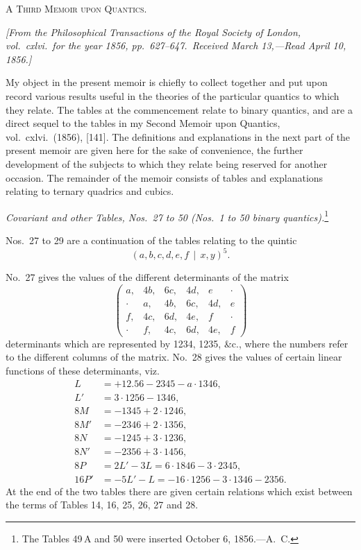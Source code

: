 \documentclass[11pt]{article}
\begin{document}
\begin{center}\textsc{A Third Memoir upon Quantics.}\end{center}

\medskip

\noindent\textit{[From the Philosophical Transactions of the Royal Society of London, vol.\ cxlvi.\ for the year 1856, pp.\ 627--647.\ Received March 13,---Read April 10, 1856.]}

\medskip

\noindent My object in the present memoir is chiefly to collect together and put upon record various results useful in the theories of the particular quantics to which they relate. The tables at the commencement relate to binary quantics, and are a direct sequel to the tables in my Second Memoir upon Quantics, vol.\ cxlvi.\ (1856), [141]. The definitions and explanations in the next part of the present memoir are given here for the sake of convenience, the further development of the subjects to which they relate being reserved for another occasion. The remainder of the memoir consists of tables and explanations relating to ternary quadrics and cubics.

\medskip

\noindent\textit{Covariant and other Tables, Nos.\ 27 to 50 (Nos.\ 1 to 50 binary quantics).}\footnote{The Tables 49\,A and 50 were inserted October 6, 1856.---A.\ C.}

\smallskip

\noindent Nos.\ 27 to 29 are a continuation of the tables relating to the quintic
\[
(a,b,c,d,e,f\,\mid\,x,y)^5.
\]

\medskip

\noindent No.\ 27 gives the values of the different determinants of the matrix
\[
\left(\begin{array}{cccccc}
a, & 4b, & 6c, & 4d, & e & \cdot \\
\cdot & a, & 4b, & 6c, & 4d, & e \\
f, & 4c, & 6d, & 4e, & f & \cdot \\
\cdot & f, & 4c, & 6d, & 4e, & f
\end{array}\right)
\]
determinants which are represented by 1234, 1235, \&c., where the numbers refer to the different columns of the matrix. No.\ 28 gives the values of certain linear functions of these determinants, viz.
\begin{align*}
L &= +12.56 - 2345 - a\cdot1346, \\
L' &= 3\cdot1256 - 1346, \\
8M &= -1345 + 2\cdot1246, \\
8M' &= -2346 + 2\cdot1356, \\
8N &= -1245 + 3\cdot1236, \\
8N' &= -2356 + 3\cdot1456, \\
8P &= 2L' - 3L = 6\cdot1846 - 3\cdot2345, \\
16P' &= -5L' - L = -16\cdot1256 - 3\cdot1346 - 2356.
\end{align*}
At the end of the two tables there are given certain relations which exist between the terms of Tables 14, 16, 25, 26, 27 and 28.
\end{document}
